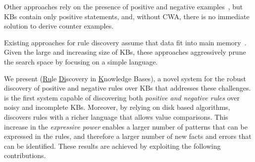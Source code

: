 \noindent {}
Other approaches rely on the presence of positive and negative examples~\cite{dehaspe1999discovery,muggleton1994inductive}, but KBs contain only positive statements, and, without CWA, there is no immediate solution to derive %
counter examples.


\noindent {}
Existing approaches for rule discovery assume that data fit into main memory~\cite{abedjan2014amending,galarraga2015fast,Chen:2016,DBLP:conf/sigmod/FaridRIHC16}. Given the large and increasing size of KBs, these approaches aggressively prune the search space by focusing on a simple language.

We present \krd (\underline{Ru}le \underline{Di}scovery in \underline{K}nowledge Bases), a novel system for the robust discovery of positive and negative rules %
over KBs that addresses these challenges.
\krd is the first system capable of discovering both {\em positive and negative rules} over noisy and incomplete KBs. 
Moreover, by relying on disk based algorithms, \krd discovers rules with a richer language that allows value comparisons. This increase in the {\em expressive power} enables a larger number of patterns that can be expressed in the rules, 
and therefore a larger number of new facts and errors that can be identified. %
These results are achieved by exploiting the following contributions.

